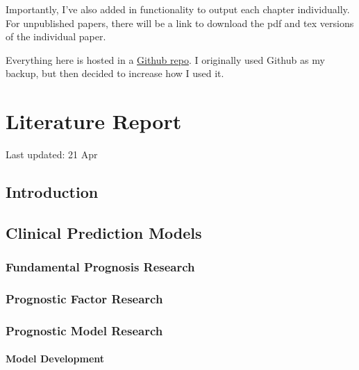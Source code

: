 \documentclass[12pt,PhD,twoside,openright]{muthesis}
\begin{document}
Importantly, I've also added in functionality to output each chapter individually. For unpublished papers, there will be a link to download the pdf and tex versions of the individual paper.

Everything here is hosted in a \href{https://https://github.com/MyKo101/Thesis}{Github repo}. I originally used Github as my backup, but then decided to increase how I used it.

\hypertarget{chap-lit-report}{%
\chapter{Literature Report}\label{chap-lit-report}}


Last updated: 21 Apr

\hypertarget{introduction-1}{%
\section{Introduction}\label{introduction-1}}

\hypertarget{clinical-prediction-models}{%
\section{Clinical Prediction Models}\label{clinical-prediction-models}}

\hypertarget{fundamental-prognosis-research}{%
\subsection{Fundamental Prognosis Research}\label{fundamental-prognosis-research}}

\hypertarget{prognostic-factor-research}{%
\subsection{Prognostic Factor Research}\label{prognostic-factor-research}}

\hypertarget{prognostic-model-research}{%
\subsection{Prognostic Model Research}\label{prognostic-model-research}}

\hypertarget{model-development}{%
\subsubsection{Model Development}\label{model-development}}
\end{document}
